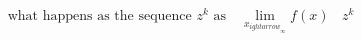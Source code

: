 \documentclass[preview]{standalone}
\begin{document}
\begin{align*}
\text{what happens as the sequence } z^k \text{ as } \text{ $\lim_{x}_{
ightarrow}_{\infty} f(x)$ } \ z^k
\end{align*}
\end{document}
